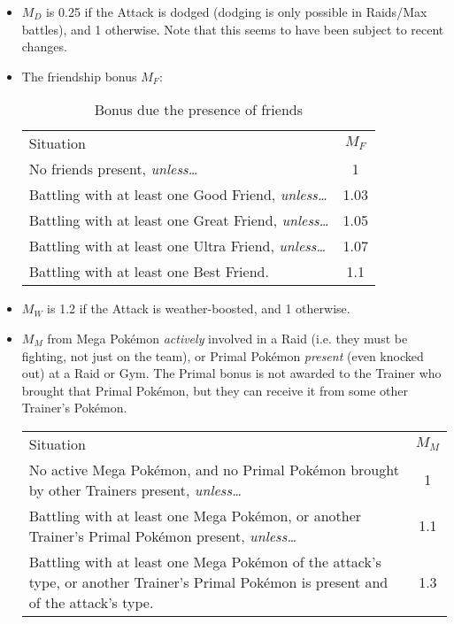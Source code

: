 \begin{itemize}
 \item $M_D$ is 0.25 if the Attack is dodged (dodging is only possible in Raids/Max battles),
 and 1 otherwise. Note that this seems to have been subject to recent changes.
 \item The friendship bonus $M_F$:
   \begin{table}[h!]
     \begin{center}
       \begin{tabular}{lc}
         Situation & $M_F$ \\
         \Midrule
         No friends present, \textit{unless…} & 1 \\
         Battling with at least one Good Friend, \textit{unless…} & 1.03 \\
         Battling with at least one Great Friend, \textit{unless…}  & 1.05 \\
         Battling with at least one Ultra Friend, \textit{unless…} & 1.07 \\
         Battling with at least one Best Friend. & 1.1
       \end{tabular}
     \end{center}
     \caption{Bonus due the presence of friends}
   \end{table}
 \item $M_W$ is 1.2 if the Attack is weather-boosted, and 1 otherwise.
 \item $M_M$ from Mega Pokémon \textit{actively} involved in a Raid (i.e. they
   must be fighting, not just on the team), or Primal Pokémon \textit{present}
   (even knocked out) at a Raid or Gym. The Primal bonus is not awarded to the Trainer who brought
   that Primal Pokémon, but they can receive it from some other Trainer's Pokémon.
   \begin{table}[h!]
     \begin{center}
       \begin{tabular}{p{}c}
         Situation & $M_M$ \\
         \Midrule
         No active Mega Pokémon, and no Primal Pokémon brought
          by other Trainers present, \textit{unless…} & 1 \\
         Battling with at least one Mega Pokémon,
          or another Trainer's Primal Pokémon present, \textit{unless…} & 1.1 \\
         Battling with at least one Mega Pokémon of the attack's type,
          or another Trainer's Primal Pokémon is present and of
          the attack's type. & 1.3 \\

\end{tabular}
\end{center}
\end{table}
\end{itemize}
